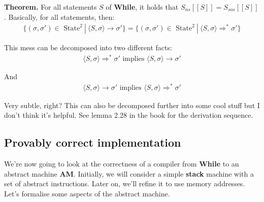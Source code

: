 \documentclass[11pt,a4paper,titlepage,dvipsnames,cmyk]{scrartcl}
\begin{document}
\begin{itemize}
\begin{itemize}
    \end{itemize}
\end{itemize}

\newpage
\textbf{Theorem.} For all statements $S$ of \textbf{While}, it holds that
$S_{ns}[[S]] = S_{sos}[[S]]$. Basically, for all statements, then:
\begin{align*}
    \{(\sigma, \sigma') \in \text{ State}^2 \ | \ \langle S, \sigma \rangle
        \rightarrow \sigma' \} = \{(\sigma, \sigma') \in \text{ State}^2 \
        | \
    \langle S, \sigma \rangle \Rightarrow ^* \sigma'\}
\end{align*}

This mess can be decomposed into two different facts:
\begin{align*}
    \langle S, \sigma \rangle \Rightarrow ^* \sigma' \text{ implies }
    \langle S, \sigma \rangle \rightarrow \sigma'
\end{align*}

And
\begin{align*}
    \langle S, \sigma \rangle \rightarrow \sigma' \text{ implies }
    \langle S, \sigma \rangle \Rightarrow^* \sigma'
\end{align*}

Very subtle, right? This can also be decomposed further into some cool
stuff but I don't think it's helpful. See lemma 2.28 in the book for the
derivation sequence.

\subsection{Provably correct implementation}%
\label{sub:Provably correct implementation}
We're now going to look at the correctness of a compiler from
\textbf{While} to an abstract machine \textbf{AM}. Initially, we will
consider a simple \textbf{stack} machine with a set of abstract
instructions. Later on, we'll refine it to use memory addresses. Let's
formalise some aspects of the abstract machine.
\end{document}
